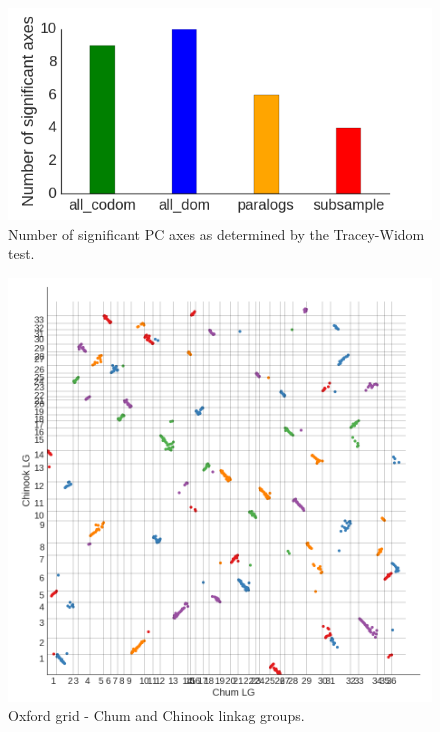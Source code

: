 \documentclass[12pt,  one column]{article}
\begin{document}
\begin{figure}[H]
\includegraphics[scale=.4]{figures/supplemental/TW_stats.png}
\caption{Number of significant PC axes as determined by the Tracey-Widom test.}
\end{figure}

\begin{figure}[H]
\includegraphics[scale=.4]{figures/supplemental/synteny_chinook.png}
\caption{Oxford grid - Chum and Chinook linkag groups.}
\end{figure}

\end{document}
